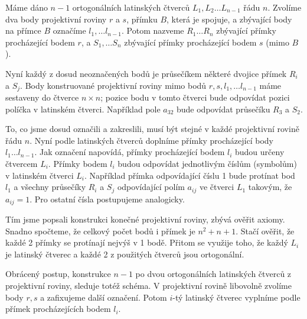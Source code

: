 \begin{t_proof}
  Máme dáno $n-1$ ortogonálních latinských čtverců $L_1,L_2\dots L_{n-1}$ řádu $n$. Zvolíme dva body projektivní roviny $r$ a $s$, přímku $B$, která je spojuje, a zbývající body na přímce $B$ označíme $l_1,\dots l_{n-1}$. Potom nazveme $R_1\dots R_n$ zbývající přímky procházející bodem $r$, a $S_1,\dots S_n$ zbývající přímky procházející bodem $s$ (mimo $B$).
  
  Nyní každý z dosud neoznačených bodů je průsečíkem některé dvojice přímek $R_i$ a $S_j$. Body konstruované projektivní roviny mimo bodů $r, s, l_1,\dots l_{n-1}$ máme sestaveny do čtverce $n\times n$; pozice bodu v tomto čtverci bude odpovídat pozici políčka v latinském čtverci. Například pole $a_{32}$ bude odpovídat průsečíku $R_3$ a $S_2$.
  
  To, co jsme dosud označili a zakreslili, musí být stejné v každé projektivní rovině řádu $n$. Nyní podle latinských čtverců doplníme přímky procházející body $l_1\dots l_{n-1}$. Jak označení napovídá, přímky procházející bodem $l_i$ budou určeny čtvercem $L_i$. Přímky bodem $l_i$ budou odpovídat jednotlivým číslům (symbolům) v latinském čtverci $L_i$. Například přímka odpovídající číslu 1 bude protínat bod $l_1$ a všechny průsečíky $R_i$ a $S_j$ odpovídající polím $a_{ij}$ ve čtverci $L_1$ takovým, že $a_{ij}=1$. Pro ostatní čísla postupujeme analogicky.
  
  Tím jsme popsali konstrukci konečné projektivní roviny, zbývá ověřit axiomy. Snadno spočteme, že celkový počet bodů i přímek je $n^2+n+1$. Stačí ověřit, že každé 2 přímky se protínají nejvýš v 1 bodě. Přitom se využije toho, že každý $L_i$ je latinský čtverec a každé 2 z použitých čtverců jsou ortogonální.
  
  Obrácený postup, konstrukce $n-1$ po dvou ortogonálních latinských čtverců z projektivní roviny, sleduje totéž schéma. V projektivní rovině libovolně zvolíme body $r, s$ a zafixujeme další označení. Potom $i$-tý latinský čtverec vyplníme podle přímek procházejících bodem $l_i$.
\end{t_proof}

